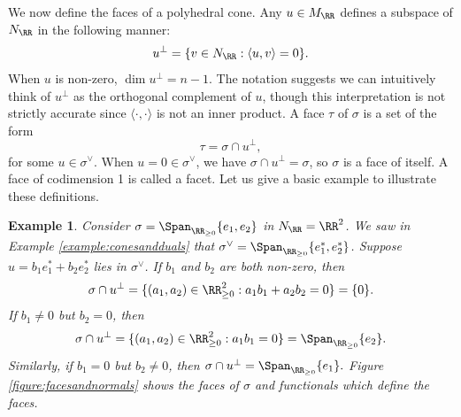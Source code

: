 \documentclass[12pt]{amsart}
\theoremstyle{plain}
\newtheorem{example}[theorem]{Example}
\begin{document}
We now define the faces of a polyhedral cone.
Any $u \in M_\RR$ defines a subspace of $N_\RR$ in the following manner:
$$u^\perp = \{v \in N_\RR : \langle u, v \rangle = 0\}.$$
When $u$ is non-zero, $\dim u^\perp = n -1$.
The notation suggests we can intuitively think of $u^\perp$ as the orthogonal complement of $u$, though this interpretation is not strictly accurate since $\langle \cdot, \cdot \rangle$ is not an inner product.
A face $\tau$ of $\sigma$ is a set of the form 
$$\tau = \sigma \cap u^\perp,$$
for some $u \in \sigma^\vee$.
When $u = 0 \in \sigma^\vee$, we have $\sigma \cap u^\perp = \sigma$, so $\sigma$ is a face of itself.
A face of codimension 1 is called a facet.
Let us give a basic example to illustrate these definitions.

\begin{example}
Consider $\sigma = \Span_{\RR_{\ge 0}} \{e_1, e_2\}$ in $N_\RR = \RR^2$.
We saw in Example \ref{example:conesandduals} that $\sigma^\vee = \Span_{\RR_{\ge 0}}\{e_1^*, e_2^*\}$.
Suppose $u = b_1 e_1^* + b_2 e_2^*$ lies in $\sigma^\vee$.
If $b_1$ and $b_2$ are both non-zero, then
$$\sigma \cap u^\perp = \{(a_1, a_2) \in \RR_{\ge 0}^2 : a_1 b_1 + a_2 b_2 = 0\} = \{0\}.$$
If $b_1 \ne 0$ but $b_2 = 0$, then
$$\sigma \cap u^\perp = \{(a_1, a_2) \in \RR_{\ge 0}^2 : a_1 b_1 = 0\} = \Span_{\RR_{\ge 0}}\{e_2\}.$$
Similarly, if $b_1 = 0$ but $b_2 \ne 0$, then $\sigma \cap u^\perp = \Span_{\RR_{\ge 0}} \{e_1\}.$
Figure \ref{figure:facesandnormals} shows the faces of $\sigma$ and functionals which define the faces.
\end{example}
\end{document}
